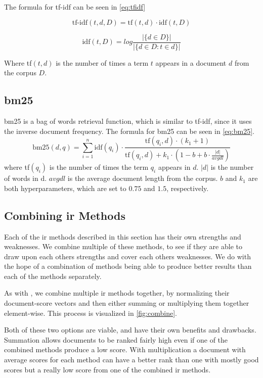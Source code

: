 The formula for \gls{tf-idf} can be seen in \autoref{eq:tfidf}

\begin{equation}\label{eq:tfidf}
	\text{tf-idf}(t, d, D) = \text{tf}(t, d) \cdot \text{idf}(t, D)
\end{equation}

\begin{equation}\label{eq:idf}
	\text{idf}(t,D) = log \frac{|\{d \in D\}|}{|\{d \in D : t \in d\}|}
\end{equation}
	
Where tf$(t, d)$ is the number of times a term $t$ appears in a document $d$ from the corpus $D$.

\subsection{\acrlong{bm25}}
\gls{bm25} is a bag of words retrieval function, which is similar to \gls{tf-idf}, since it uses the inverse document frequency.
The formula for \gls{bm25} can be seen in \autoref{eq:bm25}\cite{bm25}.
\begin{equation}\label{eq:bm25}
	\text{bm25}(d, q) = \sum_{i=1}^{n}\text{idf}(q_i) \cdot \frac{\text{tf}(q_i, d) \cdot (k_1 + 1)}{\text{tf}(q_i, d) + k_1 \cdot (1 - b + b \cdot \frac{|d|}{avgdl})}
\end{equation}
where tf$(q_i)$ is the number of times the term $q_i$ appears in $d$.
$|d|$ is the number of words in d. 
$avgdl$ is the average document length from the corpus.
$b$ and $k_1$ are both hyperparameters, which are set to $0.75$ and $1.5$, respectively.

\subsection{Combining \gls{ir} Methods}
Each of the \gls{ir} methods described in this section has their own strengths and weaknesses.
We combine multiple of these methods, to see if they are able to draw upon each others strengths and cover each others weaknesses.
We do with the hope of a combination of methods being able to produce better results than each of the methods separately.

As with \citet{yang2009topic}, we combine multiple \gls{ir} methods together, by normalizing their document-score vectors and then either summing or multiplying them together element-wise.
This process is visualized in \ref{fig:combine}.



Both of these two options are viable, and have their own benefits and drawbacks.
Summation allows documents to be ranked fairly high even if one of the combined methods produce a low score.
With multiplication a document with average scores for each method can have a better rank than one with mostly good scores but a really low score from one of the combined \gls{ir} methods.

